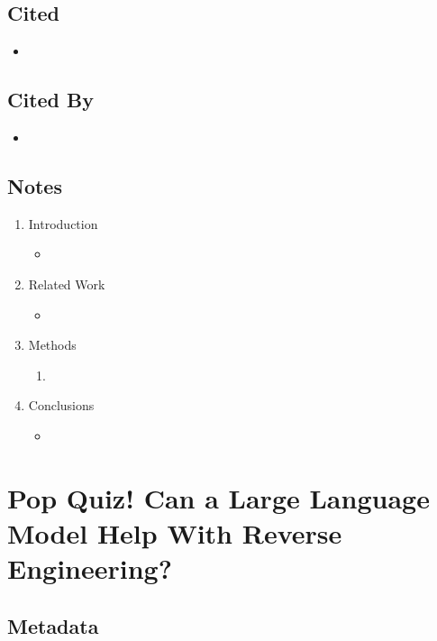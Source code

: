 \documentclass{article}
\begin{document}
\subsection*{Cited}
\begin{itemize}
	\item
\end{itemize}

\subsection*{Cited By}
\begin{itemize}
	\item
\end{itemize}

\subsection*{Notes}

\begin{enumerate}
	\item Introduction
	\begin{itemize}
		\item 
	\end{itemize}
	\item Related Work
	\begin{itemize}
		\item 
	\end{itemize}
	\item Methods
	\begin{enumerate}
		\item 
	\end{enumerate}
	\item Conclusions
	\begin{itemize}
		\item 
	\end{itemize}
\end{enumerate}

\pagebreak


\section*{Pop Quiz! Can a Large Language Model Help With Reverse Engineering?}

\subsection*{Metadata}
\end{document}
